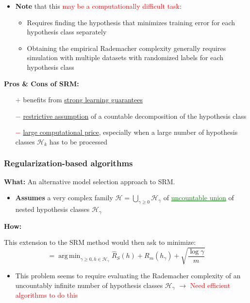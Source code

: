 \documentclass[12pt, a4paper]{article}
\DeclareMathOperator*{\argmin}{arg\,min} %
\begin{document}
\begin{itemize}
  \item \textbf{Note} that this \textcolor{red}{may be a computationally difficult task}:
  \begin{itemize}
    \item Requires finding the hypothesis that minimizes training error for each hypothesis class separately
    \item Obtaining the empirical Rademacher complexity generally requires simulation with multiple datasets with randomized labels for each hypothesis class
  \end{itemize}
\end{itemize}


\textbf{Pros \& Cons of SRM:}

\begin{itemize}
  \item[\textcolor{Green}{$+$}] benefits from \uline{strong learning guarantees}
  \item[\textcolor{red}{$-$}] \uline{restrictive assumption} of a countable decomposition of the hypothesis class
  \item[\textcolor{red}{$-$}] \uline{large computational price}, especially when a large number of hypothesis classes $\mathcal{H}_k$ has to be processed
\end{itemize}












\subsubsection{Regularization-based algorithms}\label{regularization-based-algorithms}

\textbf{What:} An alternative model selection approach to SRM.

\begin{itemize}
  \item \textbf{Assumes} a very complex family $\mathcal{H} = \bigcup_{\gamma \geq 0} \mathcal{H}_\gamma$ of \textcolor{Green}{\uline{uncountable union}} of nested hypothesis classes $\mathcal{H}_\gamma$
\end{itemize}

\textbf{How:}

This extension to the SRM method would then ask to minimize:
$$
= \argmin_{\gamma \geq 0, h \in \mathcal{H}_\gamma} \hat{R}_S(h) + R_m(h_\gamma) + \sqrt{\frac{\log{\gamma}}{m}}
$$
\begin{itemize}
  \item This problem seems to require evaluating the Rademacher complexity of an uncountably infinite number of hypothesis classes $\mathcal{H}_\gamma$ $\rightarrow$ \textcolor{red}{Need efficient algorithms to do this}
\end{itemize}
\end{document}
